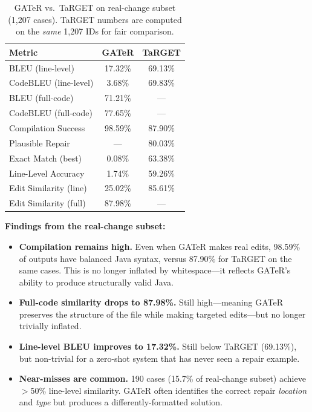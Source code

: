 \documentclass[conference,10pt]{IEEEtran}
\begin{document}
\begin{table}[h]
\centering
\caption{GATeR vs.\ TaRGET on real-change subset (1{,}207 cases).
TaRGET numbers are computed on the \emph{same} 1{,}207 IDs for
fair comparison.}
\label{tab:rc}
\begin{tabular}{lcc}
\toprule
\textbf{Metric} & \textbf{GATeR} & \textbf{TaRGET} \\
\midrule
BLEU (line-level)          &  17.32\%  &  69.13\% \\
CodeBLEU (line-level)      &   3.68\%  &  69.83\% \\
BLEU (full-code)           &  71.21\%  &    ---   \\
CodeBLEU (full-code)       &  77.65\%  &    ---   \\
Compilation Success        &  98.59\%  &  87.90\% \\
Plausible Repair           &    ---    &  80.03\% \\
Exact Match (best)         &   0.08\%  &  63.38\% \\
Line-Level Accuracy        &   1.74\%  &  59.26\% \\
Edit Similarity (line)     &  25.02\%  &  85.61\% \\
Edit Similarity (full)     &  87.98\%  &    ---   \\
\bottomrule
\end{tabular}
\end{table}

\textbf{Findings from the real-change subset:}
\begin{itemize}
  \item \textbf{Compilation remains high.}  Even when GATeR makes
        real edits, 98.59\% of outputs have balanced Java syntax,
        versus 87.90\% for TaRGET on the same cases.  This is
        no longer inflated by whitespace---it reflects GATeR's
        ability to produce structurally valid Java.
  \item \textbf{Full-code similarity drops to 87.98\%.}  Still
        high---meaning GATeR preserves the structure of the file
        while making targeted edits---but no longer trivially
        inflated.
  \item \textbf{Line-level BLEU improves to 17.32\%.}  Still
        below TaRGET (69.13\%), but non-trivial for a zero-shot
        system that has never seen a repair example.
  \item \textbf{Near-misses are common.}  190 cases (15.7\% of
        real-change subset) achieve $>$50\% line-level similarity.
        GATeR often identifies the correct repair \emph{location}
        and \emph{type} but produces a differently-formatted
        solution.
\end{itemize}
\end{document}
